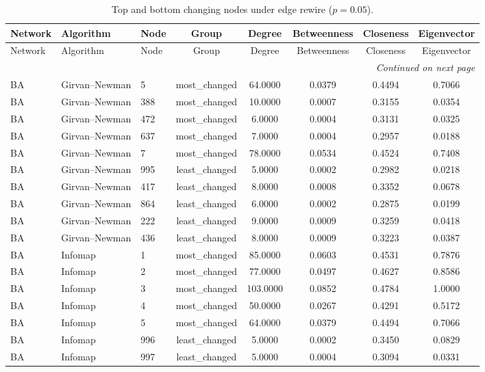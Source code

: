 \begin{longtable}{lllccccc}
\caption{Top and bottom changing nodes under edge rewire ($p=0.05$).}\label{tab:node_rewire_p005}\\
\toprule
Network & Algorithm & Node & Group & Degree & Betweenness & Closeness & Eigenvector \\
\midrule
\endfirsthead
\toprule
Network & Algorithm & Node & Group & Degree & Betweenness & Closeness & Eigenvector \\
\midrule
\endhead
\midrule
\multicolumn{8}{r}{\emph{Continued on next page}} \\
\endfoot
\bottomrule
\endlastfoot
BA & Girvan--Newman & 5 & most\_changed & 64.0000 & 0.0379 & 0.4494 & 0.7066 \\
BA & Girvan--Newman & 388 & most\_changed & 10.0000 & 0.0007 & 0.3155 & 0.0354 \\
BA & Girvan--Newman & 472 & most\_changed & 6.0000 & 0.0004 & 0.3131 & 0.0325 \\
BA & Girvan--Newman & 637 & most\_changed & 7.0000 & 0.0004 & 0.2957 & 0.0188 \\
BA & Girvan--Newman & 7 & most\_changed & 78.0000 & 0.0534 & 0.4524 & 0.7408 \\
BA & Girvan--Newman & 995 & least\_changed & 5.0000 & 0.0002 & 0.2982 & 0.0218 \\
BA & Girvan--Newman & 417 & least\_changed & 8.0000 & 0.0008 & 0.3352 & 0.0678 \\
BA & Girvan--Newman & 864 & least\_changed & 6.0000 & 0.0002 & 0.2875 & 0.0199 \\
BA & Girvan--Newman & 222 & least\_changed & 9.0000 & 0.0009 & 0.3259 & 0.0418 \\
BA & Girvan--Newman & 436 & least\_changed & 8.0000 & 0.0009 & 0.3223 & 0.0387 \\
BA & Infomap & 1 & most\_changed & 85.0000 & 0.0603 & 0.4531 & 0.7876 \\
BA & Infomap & 2 & most\_changed & 77.0000 & 0.0497 & 0.4627 & 0.8586 \\
BA & Infomap & 3 & most\_changed & 103.0000 & 0.0852 & 0.4784 & 1.0000 \\
BA & Infomap & 4 & most\_changed & 50.0000 & 0.0267 & 0.4291 & 0.5172 \\
BA & Infomap & 5 & most\_changed & 64.0000 & 0.0379 & 0.4494 & 0.7066 \\
BA & Infomap & 996 & least\_changed & 5.0000 & 0.0002 & 0.3450 & 0.0829 \\
BA & Infomap & 997 & least\_changed & 5.0000 & 0.0004 & 0.3094 & 0.0331 \\

\end{longtable}
